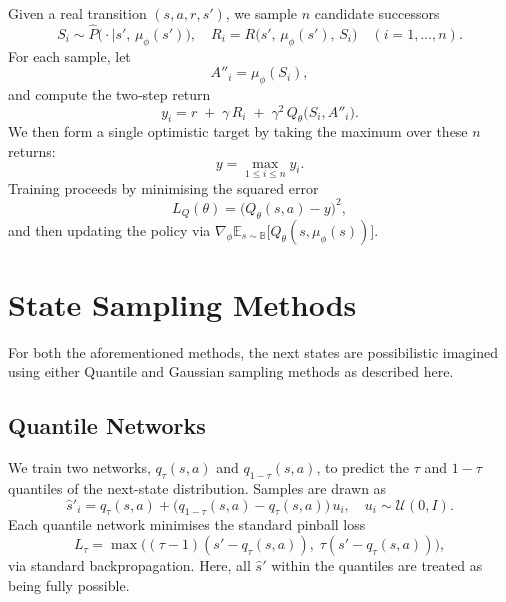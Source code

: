 \documentclass[11pt,a4paper]{report}
\begin{document}
Given a real transition \((s,a,r,s')\), we sample \(n\) candidate successors
\[
  S_i \sim \hat P\bigl(\cdot\mid s',\,\mu_\phi(s')\bigr),
  \quad
  R_i = R\bigl(s',\,\mu_\phi(s'),\,S_i\bigr)
  \quad (i=1,\dots,n).
\]
For each sample, let
\[
  A''_i = \mu_\phi(S_i),
\]
and compute the two‐step return
\[
  y_i = r 
       \;+\;\gamma\,R_i
       \;+\;\gamma^2\,Q_\theta\bigl(S_i, A''_i\bigr).
\]
We then form a single optimistic target by taking the maximum over these \(n\) returns:
\[
  y = \max_{1\le i \le n} y_i.
\]
Training proceeds by minimising the squared error
\[
  L_Q(\theta) = \bigl(Q_\theta(s,a) - y\bigr)^{2},
\]
and then updating the policy via
\(\displaystyle \nabla_\phi \mathbb E_{s\sim\mathbb B}\bigl[Q_\theta(s,\mu_\phi(s))\bigr]\).




































\section{State Sampling Methods}

For both the aforementioned methods, the next states are possibilistic imagined using either Quantile and Gaussian sampling methods as described here. 

\subsection{Quantile Networks}
We train two networks, \(q_\tau(s,a)\) and \(q_{1-\tau}(s,a)\), to predict the \(\tau\) and \(1-\tau\) quantiles of the next-state distribution. Samples are drawn as
\[
  \hat{s}'_i = q_\tau(s,a) + \bigl(q_{1-\tau}(s,a) - q_\tau(s,a)\bigr)\,u_i,\quad
  u_i \sim \mathcal U(0,I).
\]
Each quantile network minimises the standard pinball loss
\[
  L_\tau = \max\bigl((\tau-1)(s' - q_\tau(s,a)),\;\tau(s' - q_\tau(s,a))\bigr),
\]
via standard backpropagation. Here, all $\hat{s}'$ within the quantiles are treated as being fully possible. 
\end{document}
